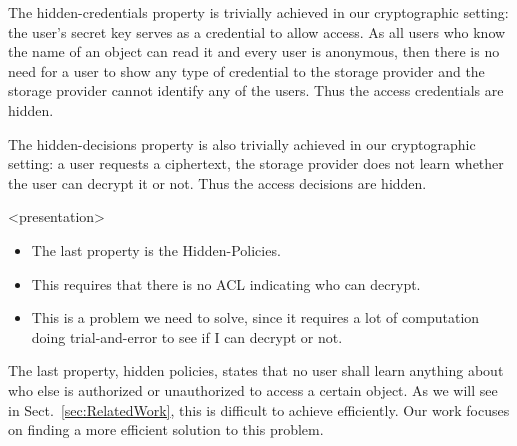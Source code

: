 The hidden-credentials property is trivially achieved in our cryptographic 
setting: the user's secret key serves as a credential to allow access.
As all users who know the name of an object can read it and every user is 
anonymous, then there is no need for a user to show any type of credential to 
the storage provider and the storage provider cannot identify any of the users.
Thus the access credentials are hidden.

%
%
%
%

The hidden-decisions property is also trivially achieved in our cryptographic 
setting: a user requests a ciphertext, the storage provider does not learn 
whether the user can decrypt it or not.
Thus the access decisions are hidden.

\begin{frame}<presentation>
  \begin{itemize}

    \item The last property is the Hidden-Policies.
      
    \item This requires that there is no \ac{ACL} indicating who can decrypt.

    \item This is a problem we need to solve, since it requires a lot of 
      computation doing trial-and-error to see if I can decrypt or not.

  \end{itemize}
\end{frame}

The last property, hidden policies, states that no user shall learn anything 
about who else is authorized or unauthorized to access a certain object.
As we will see in Sect.~\ref{sec:RelatedWork}, this is difficult to achieve 
efficiently.
Our work focuses on finding a more efficient solution to this problem.


